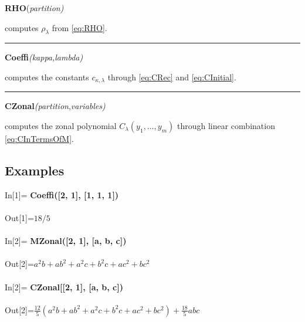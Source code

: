 \documentclass[10pt,oneside,american]{amsart}
\numberwithin{equation}{section}
\numberwithin{figure}{section}
\theoremstyle{plain}
\theoremstyle{definition}
\theoremstyle{remark}
\theoremstyle{plain}
\theoremstyle{definition}
\theoremstyle{plain}
\theoremstyle{plain}
\begin{document}
\noindent \begin{flushleft}
\textbf{RHO}(\emph{partition)}
\par\end{flushleft}

\noindent \begin{flushleft}
computes $\rho_{\lambda}$ from \eqref{eq:RHO}.
\par\end{flushleft}

\noindent \begin{flushleft}
\rule[0.5ex]{1\columnwidth}{1pt}
\par\end{flushleft}

\noindent \begin{flushleft}
\textbf{Coeffi}\emph{(kappa,lambda)}
\par\end{flushleft}

\noindent \begin{flushleft}
computes the constants $c_{\kappa,\lambda}$ through \eqref{eq:CRec}
and \eqref{eq:CInitial}.
\par\end{flushleft}

\noindent \begin{flushleft}
\rule[0.5ex]{1\columnwidth}{1pt}
\par\end{flushleft}

\noindent \begin{flushleft}
\textbf{CZonal}\emph{(partition},\emph{variables)}
\par\end{flushleft}

\noindent \begin{flushleft}
computes the zonal polynomial $C_{\lambda}\left(y_{1},\ldots,y_{m}\right)$
through linear combination \eqref{eq:CInTermsOfM}.
\par\end{flushleft}

\subsection{Examples}
\noindent \begin{flushleft}
In{[}1{]}= \textbf{Coeffi({[}2, 1{]}, {[}1, 1, 1{]})}\\
~\\
Out{[}1{]}=$18/5$\\
~\\
In{[}2{]}= \textbf{MZonal({[}2, 1{]}, {[}a, b, c{]})}\\
~\\
Out{[}2{]}=$a^{2}b+ab^{2}+a^{2}c+b^{2}c+ac^{2}+bc^{2}$\\
~\\
In{[}2{]}= \textbf{CZonal{[}{[}2, 1{]}, {[}a, b, c{]})}\\
~\\
Out{[}2{]}=$\frac{12}{5}\left(a^{2}b+ab^{2}+a^{2}c+b^{2}c+ac^{2}+bc^{2}\right)+\frac{18}{5}abc$
\par\end{flushleft}
\end{document}
